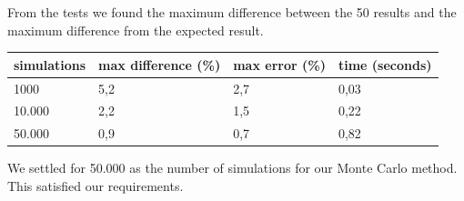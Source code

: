 From the tests we found the maximum difference between the 50 results and the maximum difference from the expected result.

\vspace{4mm}
\begin{tabular}{ | l | l | l | l | }
  \hline
  simulations & max difference (\%) & max error (\%) & time (seconds) \\
  \hline                       
  1000 & 5,2 & 2,7 & 0,03 \\
  10.000 & 2,2 & 1,5 &  0,22\\
  50.000 & 0,9 & 0,7 & 0,82\\
  \hline  
\end{tabular}
\vspace{4mm}

We settled for 50.000 as the number of simulations for our Monte Carlo method. This satisfied our requirements.